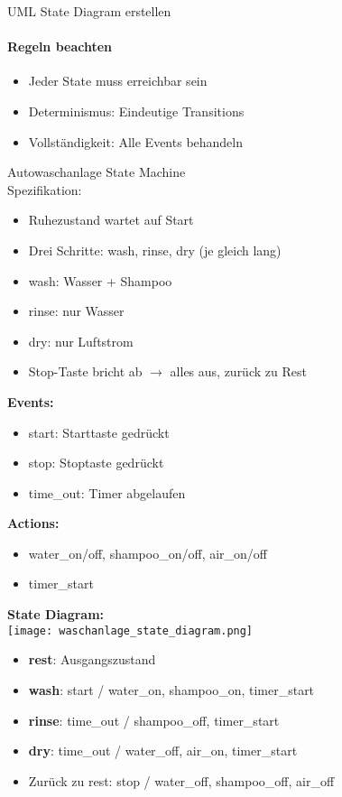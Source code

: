 \begin{KR}{UML State Diagram erstellen}
    \paragraph{Regeln beachten}
    \begin{itemize}
        \item Jeder State muss erreichbar sein
        \item Determinismus: Eindeutige Transitions
        \item Vollständigkeit: Alle Events behandeln
    \end{itemize}
\end{KR}


\begin{example2}{Autowaschanlage State Machine}\\
    Spezifikation:
    \begin{itemize}
        \item Ruhezustand wartet auf Start
        \item Drei Schritte: wash, rinse, dry (je gleich lang)
        \item wash: Wasser + Shampoo
        \item rinse: nur Wasser  
        \item dry: nur Luftstrom
        \item Stop-Taste bricht ab $\rightarrow$ alles aus, zurück zu Rest
    \end{itemize}
    
    \tcblower
    
    \textbf{Events:}
    \begin{itemize}
        \item start: Starttaste gedrückt
        \item stop: Stoptaste gedrückt
        \item time\_out: Timer abgelaufen
    \end{itemize}
    
    \textbf{Actions:}
    \begin{itemize}
        \item water\_on/off, shampoo\_on/off, air\_on/off
        \item timer\_start
    \end{itemize}
    
    \textbf{State Diagram:}\\
    \texttt{[image: waschanlage\_state\_diagram.png]}
    \begin{itemize}
        \item \textbf{rest}: Ausgangszustand
        \item \textbf{wash}: start / water\_on, shampoo\_on, timer\_start
        \item \textbf{rinse}: time\_out / shampoo\_off, timer\_start
        \item \textbf{dry}: time\_out / water\_off, air\_on, timer\_start
        \item Zurück zu rest: stop / water\_off, shampoo\_off, air\_off
    \end{itemize}
\end{example2}

